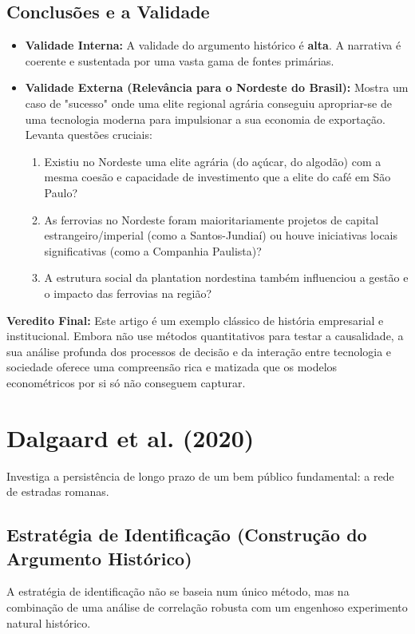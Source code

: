 \documentclass[12pt, a4paper]{article}
\begin{document}
\subsection{Conclusões e a Validade}
\begin{itemize}
    \item \textbf{Validade Interna:} A validade do argumento histórico é \textbf{alta}. A narrativa é coerente e sustentada por uma vasta gama de fontes primárias.
    \item \textbf{Validade Externa (Relevância para o Nordeste do Brasil):} Mostra um caso de "sucesso" onde uma elite regional agrária conseguiu apropriar-se de uma tecnologia moderna para impulsionar a sua economia de exportação. Levanta questões cruciais:
        \begin{enumerate}
            \item Existiu no Nordeste uma elite agrária (do açúcar, do algodão) com a mesma coesão e capacidade de investimento que a elite do café em São Paulo?
            \item As ferrovias no Nordeste foram maioritariamente projetos de capital estrangeiro/imperial (como a Santos-Jundiaí) ou houve iniciativas locais significativas (como a Companhia Paulista)?
            \item A estrutura social da plantation nordestina também influenciou a gestão e o impacto das ferrovias na região?
        \end{enumerate}
\end{itemize}

\noindent\textbf{Veredito Final:} Este artigo é um exemplo clássico de história empresarial e institucional. Embora não use métodos quantitativos para testar a causalidade, a sua análise profunda dos processos de decisão e da interação entre tecnologia e sociedade oferece uma compreensão rica e matizada que os modelos econométricos por si só não conseguem capturar. 

\section{Dalgaard et al. (2020)}
Investiga a persistência de longo prazo de um bem público fundamental: a rede de estradas romanas. 

\subsection{Estratégia de Identificação (Construção do Argumento Histórico)}
A estratégia de identificação não se baseia num único método, mas na combinação de uma análise de correlação robusta com um engenhoso experimento natural histórico.
\end{document}

